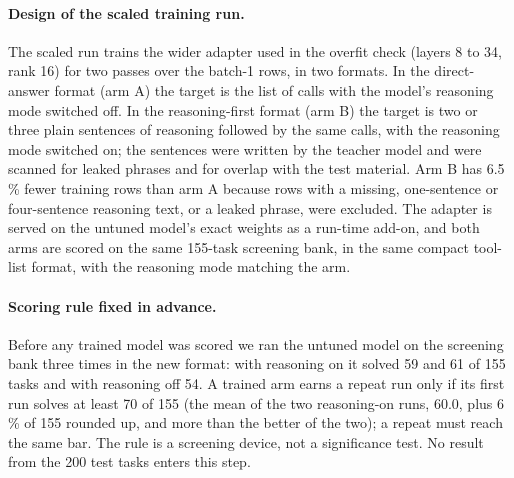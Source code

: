 \paragraph{Design of the scaled training run.} The scaled run trains the wider adapter used in the overfit check (layers 8 to 34, rank 16) for two passes over the batch-1 rows, in two formats. In the direct-answer format (arm A) the target is the list of calls with the model's reasoning mode switched off. In the reasoning-first format (arm B) the target is two or three plain sentences of reasoning followed by the same calls, with the reasoning mode switched on; the sentences were written by the teacher model and were scanned for leaked phrases and for overlap with the test material. Arm B has 6.5\,\% fewer training rows than arm A because rows with a missing, one-sentence or four-sentence reasoning text, or a leaked phrase, were excluded. The adapter is served on the untuned model's exact weights as a run-time add-on, and both arms are scored on the same 155-task screening bank, in the same compact tool-list format, with the reasoning mode matching the arm. %
\paragraph{Scoring rule fixed in advance.} Before any trained model was scored we ran the untuned model on the screening bank three times in the new format: with reasoning on it solved 59 and 61 of 155 tasks and with reasoning off 54. A trained arm earns a repeat run only if its first run solves at least 70 of 155 (the mean of the two reasoning-on runs, 60.0, plus 6\,\% of 155 rounded up, and more than the better of the two); a repeat must reach the same bar. The rule is a screening device, not a significance test. No result from the 200 test tasks enters this step. %
